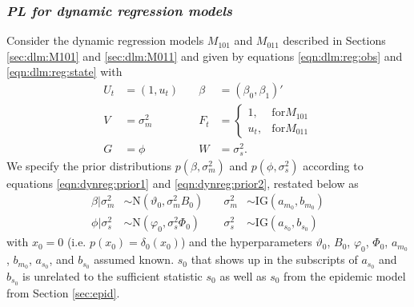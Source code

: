 \subsubsection{\emph{PL for dynamic regression models} \label{sec:pl:dr}}

Consider the dynamic regression models $M_{101}$ and $M_{011}$ described in Sections \ref{sec:dlm:M101} and \ref{sec:dlm:M011} and given by equations \eqref{eqn:dlm:reg:obs} and \eqref{eqn:dlm:reg:state} with
\begin{align*}
U_t &= (1, u_t) &\quad \beta &= (\beta_0, \beta_1)' \\
V &= \sigma^2_m &\quad F_t &= \left\{\begin{array}{ll} 1, & \mbox{for} M_{101} \\ u_t, & \mbox{for} M_{011} \end{array}\right. \\
G &= \phi &\quad W &= \sigma^2_s.
\end{align*}
We specify the prior distributions $p(\beta,\sigma^2_m)$ and $p(\phi,\sigma^2_s)$ according to equations \eqref{eqn:dynreg:prior1} and \eqref{eqn:dynreg:prior2}, restated below as
\begin{align}
\beta|\sigma^2_m &\sim \mbox{N}(\vartheta_0, \sigma^2_m B_0) &\quad \sigma^2_m &\sim \mbox{IG}(a_{m_0},b_{m_0}) \label{eqn:pl:prior:beta} \\
\phi|\sigma^2_s &\sim \mbox{N}(\varphi_0, \sigma^2_s \Phi_0) &\quad \sigma^2_s &\sim \mbox{IG}(a_{s_0},b_{s_0}) \label{eqn:pl:prior:phi}
\end{align}
with $x_0 = 0$ (i.e. $p(x_0) = \delta_0(x_0)$) and the hyperparameters $\vartheta_0$, $B_0$, $\varphi_0$, $\Phi_0$, $a_{m_0}$, $b_{m_0}$, $a_{s_0}$, and $b_{s_0}$ assumed known. $s_0$ that shows up in the subscripts of $a_{s_0}$ and $b_{s_0}$ is unrelated to the sufficient statistic $s_0$ as well as $s_0$ from the epidemic model from Section \eqref{sec:epid}.

